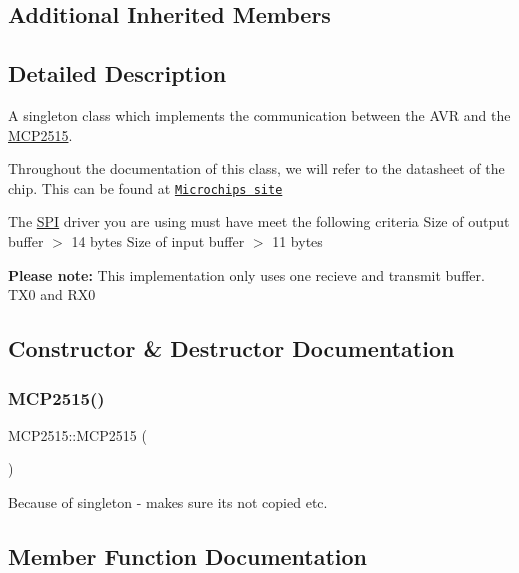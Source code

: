 \subsection*{Additional Inherited Members}


\subsection{Detailed Description}
A singleton class which implements the communication between the A\+VR and the \hyperlink{class_m_c_p2515}{M\+C\+P2515}. 

Throughout the documentation of this class, we will refer to the datasheet of the chip. This can be found at \href{http://ww1.microchip.com/downloads/en/DeviceDoc/21801G.pdf}{\tt Microchips site}

The \hyperlink{namespace_s_p_i}{S\+PI} driver you are using must have meet the following criteria Size of output buffer $>$ 14 bytes  Size of input buffer $>$ 11 bytes 

{\bfseries Please note\+:} This implementation only uses one recieve and transmit buffer. T\+X0 and R\+X0 

\subsection{Constructor \& Destructor Documentation}
\hypertarget{class_m_c_p2515_a8cd4111604b740feb758bd4d077f4fb8}{}\label{class_m_c_p2515_a8cd4111604b740feb758bd4d077f4fb8} 
\subsubsection{\texorpdfstring{M\+C\+P2515()}{MCP2515()}}
{\footnotesize\ttfamily M\+C\+P2515\+::\+M\+C\+P2515 (\begin{DoxyParamCaption}\item[{const \hyperlink{class_m_c_p2515}{M\+C\+P2515} \&}]{ }\end{DoxyParamCaption})\hspace{0.3cm}{\ttfamily [delete]}}

Because of singleton -\/ makes sure its not copied etc. 

\subsection{Member Function Documentation}
\hypertarget{class_m_c_p2515_aa9a35fe139adf1fccaaceec561544c14}{}\label{class_m_c_p2515_aa9a35fe139adf1fccaaceec561544c14} 
